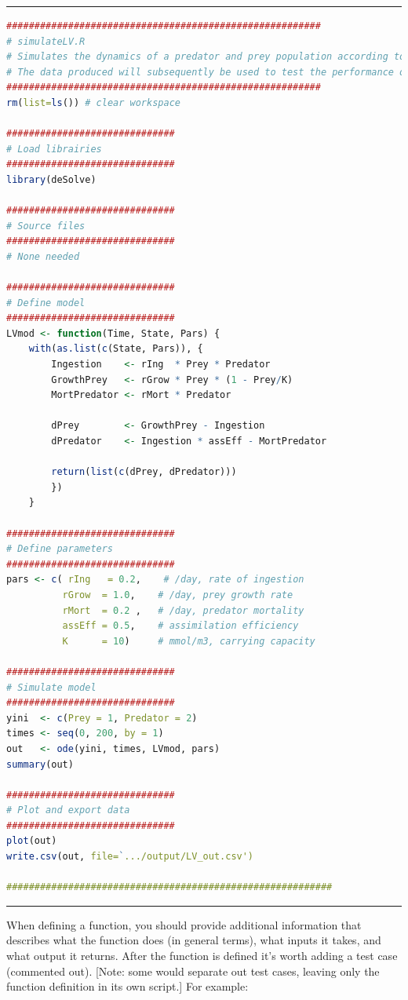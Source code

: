 \documentclass[12pt,letterpaper]{article}
\begin{document}
\noindent\rule{12cm}{0.4pt}
\begin{lstlisting}[language=R]
########################################################
# simulateLV.R
# Simulates the dynamics of a predator and prey population according to the Lotka-Volterra model.
# The data produced will subsequently be used to test the performance of several population dynamic model-fitting routines.
########################################################
rm(list=ls()) # clear workspace

##############################
# Load librairies
##############################
library(deSolve)

##############################
# Source files
##############################
# None needed

##############################
# Define model
##############################
LVmod <- function(Time, State, Pars) {
	with(as.list(c(State, Pars)), {
		Ingestion    <- rIng  * Prey * Predator
		GrowthPrey   <- rGrow * Prey * (1 - Prey/K)
		MortPredator <- rMort * Predator

		dPrey        <- GrowthPrey - Ingestion
		dPredator    <- Ingestion * assEff - MortPredator

		return(list(c(dPrey, dPredator)))
		})
	}

##############################
# Define parameters
##############################
pars <- c( rIng   = 0.2,    # /day, rate of ingestion
	      rGrow  = 1.0,    # /day, prey growth rate
	      rMort  = 0.2 ,   # /day, predator mortality
	      assEff = 0.5,    # assimilation efficiency
	      K      = 10)     # mmol/m3, carrying capacity

##############################
# Simulate model
##############################
yini  <- c(Prey = 1, Predator = 2)
times <- seq(0, 200, by = 1)
out   <- ode(yini, times, LVmod, pars)
summary(out)

##############################
# Plot and export data
##############################
plot(out)
write.csv(out, file=`.../output/LV_out.csv')

##########################################################
\end{lstlisting}
\noindent\rule{12cm}{0.4pt}

When defining a function, you should provide additional information that describes what the function does (in general terms), what inputs it takes, and what output it returns.  After the function is defined it's worth adding a test case (commented out).  [Note: some would separate out test cases, leaving only the function definition in its own script.]  For example:
\end{document}
